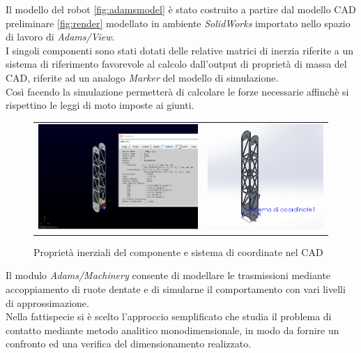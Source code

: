\documentclass[%
corpo=11pt,
twoside,
 stile=classica,
oldstyle,
greek,%
]{toptesi}
\begin{document}
	Il modello del robot \ref{fig:adamsmodel} è stato costruito a partire dal modello CAD preliminare \ref{fig:render} modellato in ambiente \textit{SolidWorks} importato nello spazio di lavoro di \textit{Adams/View}.\\
	 I singoli componenti sono stati dotati delle relative matrici di inerzia riferite a un sistema di riferimento favorevole al calcolo dall'output di proprietà di massa del CAD,  riferite ad un analogo \textit{Marker} del modello di simulazione. \\
	 Così facendo la simulazione permetterà di calcolare le forze necessarie affinchè si rispettino le leggi di moto imposte ai giunti.
			\begin{figure}
			\centering
			\begin{tabular} {ll}
		
			\includegraphics[height=4cm, keepaspectratio]{Screen/inertia.png}
			&
			\includegraphics[height=4cm, keepaspectratio]{Screen/coordinate.png}
			\end{tabular}
			\caption{Proprietà inerziali del componente e sistema di coordinate nel CAD}
			\label{fig:inertia}
			\end{figure}
	 Il modulo \textit{Adams/Machinery} consente di modellare le trasmissioni mediante accoppiamento di ruote dentate e di simularne il comportamento con vari livelli di approssimazione. \\
	 Nella fattispecie si è scelto l'approccio semplificato che studia il problema di contatto mediante metodo analitico monodimensionale, in modo da fornire un confronto ed una verifica del dimensionamento realizzato. 	
\end{document}
